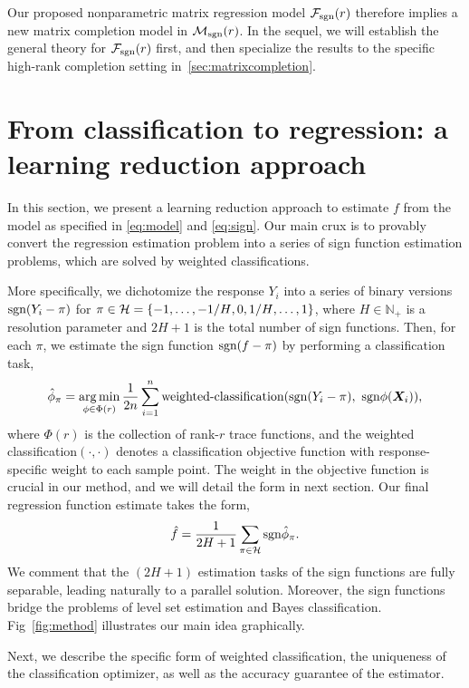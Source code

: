 \documentclass[aos]{imsart}
\theoremstyle{definition}
\def\sign{\textup{sgn}}
\def\caliF{\tF_{\textup{sgn}}}
\def\caliM{\tM_{\textup{sgn}}}
\begin{document}
Our proposed nonparametric matrix regression model $\caliF(r)$ therefore implies a new matrix completion model in $\caliM(r)$. In the sequel, we will establish the general theory for $\caliF(r)$ first, and then specialize the results to the specific high-rank completion setting in~\ref{sec:matrixcompletion}. 

\section{From classification to regression: a learning reduction approach}
\label{sec:bridge}

In this section, we present a learning reduction approach to estimate $f$ from the model as specified in \eqref{eq:model} and \eqref{eq:sign}. Our main crux is to provably convert
the regression estimation problem into a series of sign function estimation problems, which are solved by weighted classifications. 

More specifically, we dichotomize the response $Y_i$ into a series of binary versions $\sign(Y_i-\pi)$ for $\pi\in\mathcal{H}=\{-1,\ldots,-{1/H}, 0, {1/H}, \ldots,1\}$, where $H\in\mathbb{N}_{+}$ is a resolution parameter and $2H+1$ is the total number of sign functions. Then, for each $\pi$, we estimate the sign function $\sign(f-\pi)$ by performing a classification task, 
\begin{equation}\label{eq:proposal}
\hat \phi_\pi =\argmin_{\phi\in\Phi(r)}{1\over 2n}\sum_{i=1}^n\text{weighted-classification}(\sign(Y_i-\pi),\ \sign \phi(\mX_i)),
\end{equation}
where $\Phi(r)$ is the collection of rank-$r$ trace functions, and the weighted classification$(\cdot,\cdot)$ denotes a classification objective function with response-specific weight to each sample point. The weight in the objective function is crucial in our method, and we will detail the form in next section. Our final regression function estimate takes the form, 
\begin{equation}\label{eq:stepfunction}
\hat f= {1\over 2H+1}\sum_{\pi \in \tH} \sign \hat \phi_\pi.
\end{equation}
We comment that the $(2H+1)$ estimation tasks of the sign functions are fully separable, leading naturally to a parallel solution. Moreover, the sign functions bridge the problems of level set estimation and Bayes classification. Fig~\ref{fig:method} illustrates our main idea graphically. 

Next, we describe the specific form of weighted classification, the uniqueness of the classification optimizer, as well as the accuracy guarantee of the estimator. 
\end{document}
